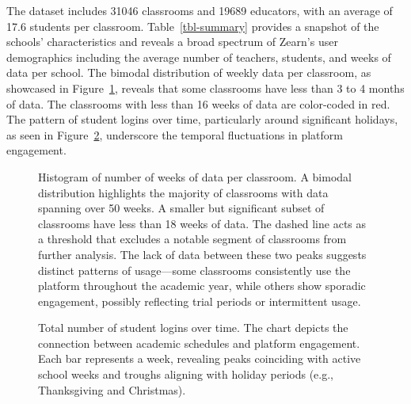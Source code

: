 \documentclass[
  number,
  preprint,
  3p,
  onecolumn]{elsarticle}
\begin{document}
The dataset includes 31046 classrooms and 19689 educators, with an
average of 17.6 students per classroom. Table~\ref{tbl-summary} provides
a snapshot of the schools' characteristics and reveals a broad spectrum
of Zearn's user demographics including the average number of teachers,
students, and weeks of data per school. The bimodal distribution of
weekly data per classroom, as showcased in
Figure~\ref{fig-classroom-weeks}, reveals that some classrooms have less
than 3 to 4 months of data. The classrooms with less than 16 weeks of
data are color-coded in red. The pattern of student logins over time,
particularly around significant holidays, as seen in
Figure~\ref{fig-logins-week}, underscore the temporal fluctuations in
platform engagement.

\begin{figure}


\caption{\label{fig-classroom-weeks}Histogram of number of weeks of data
per classroom. A bimodal distribution highlights the majority of
classrooms with data spanning over 50 weeks. A smaller but significant
subset of classrooms have less than 18 weeks of data. The dashed line
acts as a threshold that excludes a notable segment of classrooms from
further analysis. The lack of data between these two peaks suggests
distinct patterns of usage---some classrooms consistently use the
platform throughout the academic year, while others show sporadic
engagement, possibly reflecting trial periods or intermittent usage.}

\end{figure}%

\begin{figure}


\caption{\label{fig-logins-week}Total number of student logins over
time. The chart depicts the connection between academic schedules and
platform engagement. Each bar represents a week, revealing peaks
coinciding with active school weeks and troughs aligning with holiday
periods (e.g., Thanksgiving and Christmas).}

\end{figure}%
\end{document}
